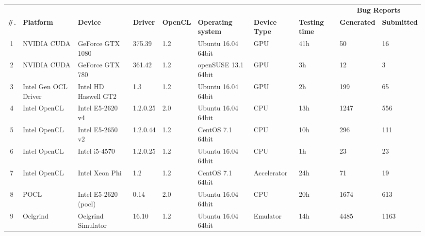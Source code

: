 \begin{tabular}{ clllllll | ll }
\toprule
 & & & & & & & & \multicolumn{2}{c}{\textbf{Bug Reports}} \\
\textbf{\#. } & \textbf{Platform} & \textbf{Device} & \textbf{Driver} & \textbf{OpenCL} & 
\textbf{Operating system} & \textbf{Device Type} & \textbf{Testing time} &
\textbf{Generated} & \textbf{Submitted} \\
\midrule
1 & NVIDIA CUDA & GeForce GTX 1080 & 375.39 & 1.2 & Ubuntu 16.04 64bit & GPU & 41h & 50 & 16 \\
2 & NVIDIA CUDA & GeForce GTX 780 & 361.42 & 1.2 & openSUSE  13.1 64bit & GPU & 3h & 12 & 3 \\
3 & Intel Gen OCL Driver & Intel HD Haswell GT2 & 1.3 & 1.2 & Ubuntu 16.04 64bit & GPU & 2h & 199 & 65 \\
4 & Intel OpenCL & Intel E5-2620 v4 & 1.2.0.25 & 2.0 & Ubuntu 16.04 64bit & CPU & 13h & 1247 & 556 \\
5 & Intel OpenCL & Intel E5-2650 v2 & 1.2.0.44 & 1.2 & CentOS 7.1 64bit & CPU & 10h & 296 & 111 \\
6 & Intel OpenCL & Intel i5-4570 & 1.2.0.25 & 1.2 & Ubuntu 16.04 64bit & CPU & 1h & 23 & 23 \\
7 & Intel OpenCL & Intel Xeon Phi & 1.2 & 1.2 & CentOS 7.1 64bit & Accelerator & 24h & 71 & 19 \\
8 & POCL & Intel E5-2620 (pocl) & 0.14 & 2.0 & Ubuntu 16.04 64bit & CPU & 20h & 1674 & 613 \\
9 & Oclgrind & Oclgrind Simulator & 16.10 & 1.2 & Ubuntu 16.04 64bit & Emulator & 14h & 4485 & 1163 \\

\bottomrule
\end{tabular}

